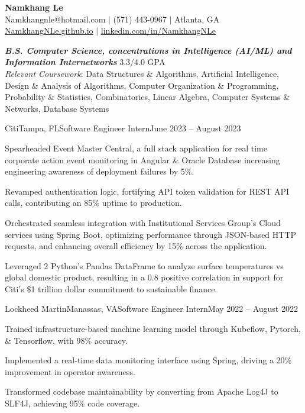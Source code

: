 \documentclass{article}
\begin{document}
\thispagestyle{empty}

\begin{center}
    \textbf{\LARGE Namkhang Le} \\
    Namkhangnle@hotmail.com $|$ (571) 443-0967 $|$ Atlanta, GA \\
    \href{https://namkhangnle.github.io/}{NamkhangNLe.github.io} $|$ \href{https://www.linkedin.com/in/namkhangnle/}{linkedin.com/in/NamkhangNLe}
\end{center}

\begin{flushleft}


{\textbf{\textit{B.S. Computer Science, concentrations in Intelligence (AI/ML) and Information Internetworks}} \hfill 3.3/4.0 GPA \\ \textit{Relevant Coursework}: Data Structures \& Algorithms, Artificial Intelligence, Design \& Analysis of Algorithms, Computer Organization \& Programming, Probability \& Statistics, Combinatorics, Linear Algebra, Computer Systems \& Networks, Database Systems }


    \begin{experience}{Citi}{Tampa, FL}{Software Engineer Intern}{June 2023 -- August 2023}
        \item Spearheaded Event Master Central, a full stack application for real time corporate action event monitoring in Angular \& Oracle Database increasing engineering awareness of deployment failures by 5\%.
        \item Revamped authentication logic, fortifying API token validation for REST API calls, contributing an 85\% uptime to production.
        \item Orchestrated seamless integration with Institutional Services Group's Cloud services using Spring Boot, optimizing performance through JSON-based HTTP requests, and enhancing overall efficiency by 15\% across the application.
        \item Leveraged 2 Python’s Pandas DataFrame to analyze surface temperatures vs global domestic product, resulting in a 0.8 positive correlation in support for Citi's \$1 trillion dollar commitment to sustainable finance.
    \end{experience}

    \begin{experience}{Lockheed Martin}{Manassas, VA}{Software Engineer Intern}{May 2022 -- August 2022}
        \item Trained infrastructure-based machine learning model through Kubeflow, Pytorch, \& Tensorflow, with 98\% accuracy.
        \item Implemented a real-time data monitoring interface using Spring, driving a 20\% improvement in operator awareness.
        \item Transformed codebase maintainability by converting from Apache Log4J to SLF4J, achieving 95\% code coverage.
        

\end{experience}
\end{flushleft}
\end{document}
